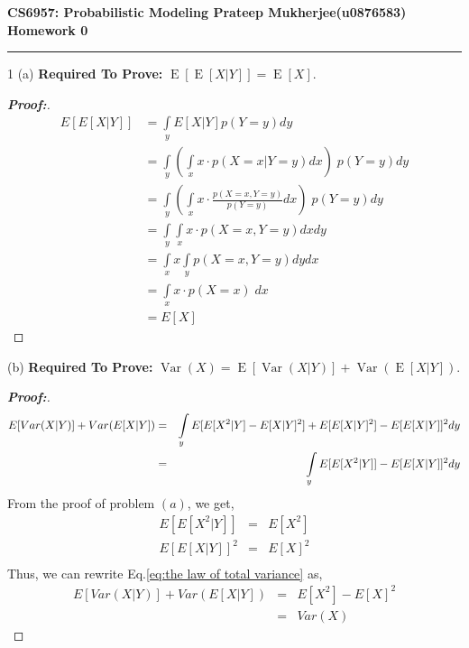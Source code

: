 \documentclass[11pt]{article}
\DeclareMathOperator{\E}{E}
\DeclareMathOperator{\Var}{Var}
\begin{document}
\thispagestyle{empty}
{\large{\bf CS6957: Probabilistic Modeling \hfill Prateep Mukherjee(u0876583)}}\\

{\LARGE{\bf Homework 0}}
\vspace{0.2\baselineskip}
\hrule

1 (a)
\textbf{Required To Prove:} $\E[ \E[X | Y] ] = \E[X]$.\\

\begin{proof}[\bf{Proof:}]

\begin{align*}
E[E[X|Y]] &= \int\limits_y E[X|Y] p(Y=y) dy \\
&= \int\limits_y (\int\limits_x x \cdot p(X=x|Y=y) dx) \; p(Y=y) dy \\
&= \int\limits_y (\int\limits_x x \cdot \frac{p(X=x,Y=y)}{p(Y=y)} dx) \; p(Y=y) dy \\
&= \int\limits_y \int\limits_x x \cdot p(X=x,Y=y) dx dy \\
&= \int\limits_x x \int\limits_y p(X=x,Y=y) dy   dx \\
&= \int\limits_x x \cdot p(X=x) \; dx \\
&= E[X]
\end{align*}

\end{proof}

\par (b) \textbf{Required To Prove:} $\Var(X) = \E[\Var(X | Y)] + \Var(\E[X | Y])$.\\

\begin{proof}[\bf{Proof:}]

\begin{eqnarray} \label{eq:the law of total variance}
E[Var(X|Y)] + Var(E[X|Y]) &=& \int\limits_y E[E[X^2|Y] - E[X|Y]^2] + E[E[X|Y]^2] - E[E[X|Y]]^2 dy \notag \\
&=& \int\limits_y E[E[X^2|Y]] - E[E[X|Y]]^2 dy
\end{eqnarray}
From the proof of problem $(a)$, we get,
\begin{eqnarray*}
E[E[X^2|Y]] &=& E[X^2]\\
E[E[X|Y]]^2 &=& E[X]^2\\
\end{eqnarray*}
Thus, we can rewrite Eq.\eqref{eq:the law of total variance} as,
\begin{eqnarray*}
E[Var(X|Y)] + Var(E[X|Y]) &=& E[X^2]-E[X]^2\\
&=& Var(X)
\end{eqnarray*}

\end{proof}
\end{document}
